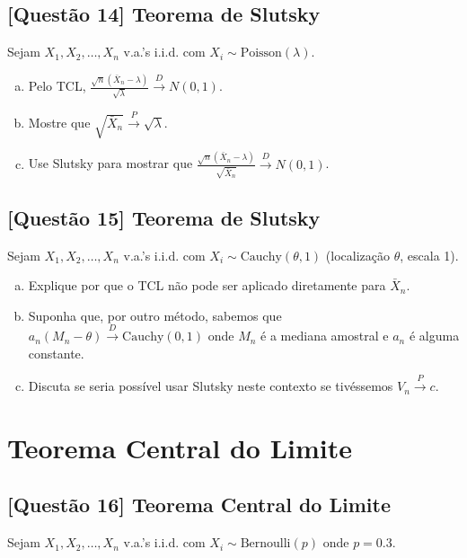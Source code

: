 \documentclass[12pt,a4paper]{article}
\begin{document}
\subsection*{[Questão 14] Teorema de Slutsky}

Sejam $X_1, X_2, \ldots, X_n$ v.a.'s i.i.d. com $X_i \sim \text{Poisson}(\lambda)$.

\begin{enumerate}[(a)]
    \item Pelo TCL, $\frac{\sqrt{n}(\bar{X}_n - \lambda)}{\sqrt{\lambda}} \xrightarrow{D} N(0,1)$.
    \item Mostre que $\sqrt{\bar{X}_n} \xrightarrow{P} \sqrt{\lambda}$.
    \item Use Slutsky para mostrar que $\frac{\sqrt{n}(\bar{X}_n - \lambda)}{\sqrt{\bar{X}_n}} \xrightarrow{D} N(0,1)$.
\end{enumerate}

\subsection*{[Questão 15] Teorema de Slutsky}

Sejam $X_1, X_2, \ldots, X_n$ v.a.'s i.i.d. com $X_i \sim \text{Cauchy}(\theta, 1)$ (localização $\theta$, escala 1).

\begin{enumerate}[(a)]
    \item Explique por que o TCL não pode ser aplicado diretamente para $\bar{X}_n$.
    \item Suponha que, por outro método, sabemos que $a_n(M_n - \theta) \xrightarrow{D} \text{Cauchy}(0,1)$ onde $M_n$ é a mediana amostral e $a_n$ é alguma constante.
    \item Discuta se seria possível usar Slutsky neste contexto se tivéssemos $V_n \xrightarrow{P} c$.
\end{enumerate}

\section{Teorema Central do Limite}

\subsection*{[Questão 16] Teorema Central do Limite}

Sejam $X_1, X_2, \ldots, X_n$ v.a.'s i.i.d. com $X_i \sim \text{Bernoulli}(p)$ onde $p = 0.3$.
\end{document}
